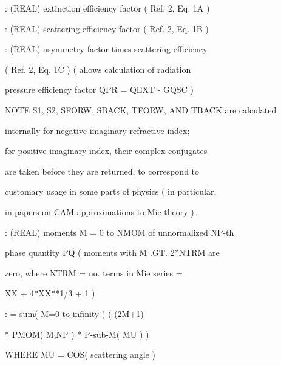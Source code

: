 \documentclass[letterpaper,10pt,english]{sphinxmanual}
\begin{document}
\begin{fulllineitems}
\begin{DUlineblock}{0em}
\item[] :       (REAL) extinction efficiency factor  ( Ref. 2, Eq. 1A )
\item[] :       (REAL) scattering efficiency factor  ( Ref. 2, Eq. 1B )
\item[] :       (REAL) asymmetry factor times scattering efficiency
\item[]
\begin{DUlineblock}{\DUlineblockindent}
\item[] ( Ref. 2, Eq. 1C )  ( allows calculation of radiation
\item[]
\begin{DUlineblock}{\DUlineblockindent}
\item[] pressure efficiency factor  QPR = QEXT - GQSC )
\end{DUlineblock}
\item[] NOTE \textendash{} S1, S2, SFORW, SBACK, TFORW, AND TBACK are calculated
\item[] internally for negative imaginary refractive index;
\item[] for positive imaginary index, their complex conjugates
\item[] are taken before they are returned, to correspond to
\item[] customary usage in some parts of physics ( in particular,
\item[] in papers on CAM approximations to Mie theory ).
\end{DUlineblock}
\item[] : (REAL) moments  M = 0 to NMOM  of unnormalized NP-th
\item[]
\begin{DUlineblock}{\DUlineblockindent}
\item[] phase quantity PQ  ( moments with  M .GT. 2*NTRM  are
\item[] zero, where  NTRM = no. terms in Mie series =
\item[] XX + 4*XX**1/3 + 1 )
\end{DUlineblock}
\item[] : = sum( M=0 to infinity ) ( (2M+1)
\item[]
\begin{DUlineblock}{\DUlineblockindent}
\item[] * PMOM( M,NP ) * P-sub-M( MU ) )
\item[] WHERE  MU = COS( scattering angle )

\end{DUlineblock}
\end{DUlineblock}
\end{fulllineitems}
\end{document}
